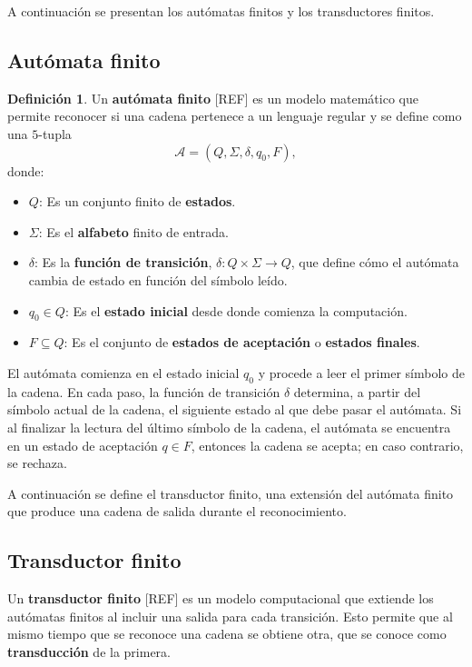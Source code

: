 \documentclass{report}
\theoremstyle{definition}
\newtheorem{definicion}{Definición}[chapter]
\theoremstyle{plain}
\theoremstyle{remark}
\begin{document}
A continuación se presentan los autómatas finitos y los transductores finitos.

\subsection{Autómata finito}

\begin{definicion}
Un \textbf{autómata finito} [REF] es un modelo matemático que
permite reconocer si una cadena pertenece a un lenguaje regular y se
define como una $5$-tupla
\[
  \mathcal{A} = (Q, \Sigma, \delta, q_0, F),
\]
donde:
\begin{itemize}
  \item $Q$: Es un conjunto finito de \textbf{estados}.
  \item $\Sigma$: Es el \textbf{alfabeto} finito de entrada.
  \item $\delta$: Es la \textbf{función de transición},
    $\delta : Q \times \Sigma \to Q$, que define cómo el autómata cambia
    de estado en función del símbolo leído.
  \item $q_0 \in Q$: Es el \textbf{estado inicial} desde donde comienza la
    computación.
  \item $F \subseteq Q$: Es el conjunto de \textbf{estados de aceptación}
    o \textbf{estados finales}.
\end{itemize}
\end{definicion}

El autómata comienza en el estado inicial $q_0$ y procede a leer el primer
símbolo de la cadena. En cada paso, la función de transición $\delta$
determina, a partir del símbolo actual de la cadena, el siguiente estado
al que debe pasar el autómata. Si al finalizar la lectura del último
símbolo de la cadena, el autómata se encuentra en un estado de aceptación
$q \in F$, entonces la cadena se acepta; en caso contrario, se rechaza.

A continuación se define el transductor finito, una extensión del autómata
finito que produce una cadena de salida durante el reconocimiento.

\subsection{Transductor finito}
\label{sec:transductor}

Un \textbf{transductor finito} [REF] es un modelo computacional
que extiende los autómatas finitos al incluir una salida para cada
transición. Esto permite que al mismo tiempo que se reconoce una cadena
se obtiene otra, que se conoce como \textbf{transducción} de la primera.
\end{document}
